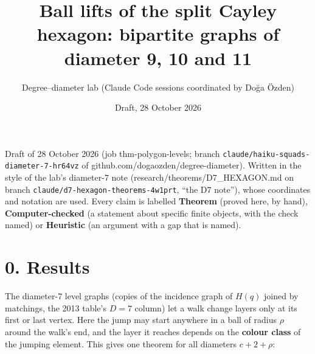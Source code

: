 \documentclass[
  10pt,
]{article}
\title{Ball lifts of the split Cayley hexagon: bipartite graphs of
diameter 9, 10 and 11}
\author{Degree--diameter lab (Claude Code sessions coordinated by Doğa
Özden)}
\date{Draft, 28 October 2026}
\begin{document}
\maketitle

Draft of 28 October 2026 (job thm-polygon-levels; branch
\texttt{claude/haiku-squads-diameter-7-hr64vz} of
github.com/dogaozden/degree-diameter). Written in the style of the lab's
diameter-7 note (research/theorems/D7\_HEXAGON.md on branch
\texttt{claude/d7-hexagon-theorems-4w1prt}, ``the D7 note''), whose
coordinates and notation are used. Every claim is labelled
\textbf{Theorem} (proved here, by hand), \textbf{Computer-checked} (a
statement about specific finite objects, with the check named) or
\textbf{Heuristic} (an argument with a gap that is named).

\hypertarget{results}{%
\section{0. Results}\label{results}}

The diameter-7 level graphs (copies of the incidence graph of \(H(q)\)
joined by matchings, the 2013 table's \(D = 7\) column) let a walk
change layers only at its first or last vertex. Here the jump may start
anywhere in a ball of radius \(\rho\) around the walk's end, and the
layer it reaches depends on the \textbf{colour class} of the jumping
element. This gives one theorem for all diameters \(c+2+\rho\):
\end{document}
